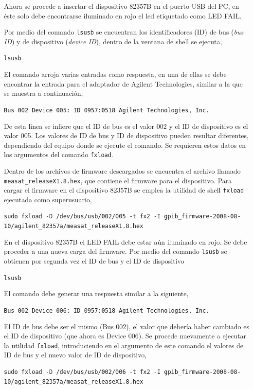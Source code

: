 \documentclass[paper=letter,oneside,fontsize=11pt, parskip=full]{scrartcl}
\begin{document}
		Ahora se procede a insertar el dispositivo 82357B en el puerto USB del PC, en éste solo debe encontrarse iluminado en rojo el led etiquetado como LED FAIL. 
		
		Por medio del comando \texttt{lsusb} se encuentran los identificadores (ID) de bus (\emph{bus ID}) y de dispositivo (\emph{device ID}), dentro de la ventana de shell se ejecuta,
		
		\texttt{lsusb}
		
		El comando arroja varias entradas como respuesta, en una de ellas se debe encontrar la entrada para el adaptador de Agilent Technologies, similar a la que se muestra a continuación,
	
		\texttt{Bus 002 Device 005: ID 0957:0518 Agilent Technologies, Inc.}
		
		De esta linea se infiere que el ID de bus es el valor 002 y el ID de dispositivo es el valor 005. Los valores de ID de bus y ID de dispositivo pueden resultar diferentes, dependiendo del equipo donde se ejecute el comando. Se requieren estos datos en los argumentos del comando \texttt{fxload}.
		
		Dentro de los archivos de firmware descargados se encuentra el archivo llamado \texttt{measat\_releaseX1.8.hex}, que contiene el firmware para el dispositivo. Para cargar el firmware en el dispositivo 82357B se emplea la utilidad de shell \texttt{fxload} ejecutada como superusuario, 
		
		\texttt{sudo fxload -D /dev/bus/usb/002/005  -t fx2 -I gpib\_firmware-2008-08-10/agilent\_82357a/measat\_releaseX1.8.hex}
		
		En el dispositivo 82357B el LED FAIL debe estar aún iluminado en rojo. Se debe proceder a una nueva carga del firmware. Por medio del comando \texttt{lsusb} se obtienen por segunda vez el ID de bus y el ID de dispositivo
		
		\texttt{lsusb}
		
		El comando debe generar una respuesta similar a la siguiente,
		
		\texttt{Bus 002 Device 006: ID 0957:0518 Agilent Technologies, Inc.}
		
		El ID de bus debe ser el mismo (Bus 002), el valor que debería haber cambiado es el ID de dispositivo (que ahora es Device 006). Se procede nuevamente a ejecutar la utilidad \texttt{fxload}, introduciendo en el argumento de este comando el valores de ID de bus y el nuevo valor de ID de dispositivo,
		
		\texttt{sudo fxload -D /dev/bus/usb/002/006  -t fx2 -I gpib\_firmware-2008-08-10/agilent\_82357a/measat\_releaseX1.8.hex}	
		
\end{document}
